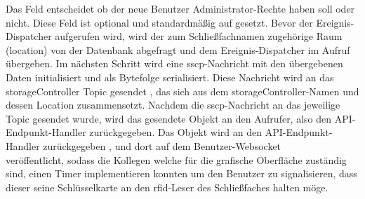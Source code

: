 Das Feld  entscheidet ob der neue Benutzer Administrator-Rechte haben soll oder nicht. Diese Feld ist optional und standardmäßig auf  gesetzt. Bevor der Ereignis-Dispatcher aufgerufen wird, wird der zum Schließfachnamen zugehörige Raum (location) von der Datenbank abgefragt und dem Ereignis-Dispatcher im Aufruf  übergeben. Im nächsten Schritt wird eine \acrshort{sscp}-Nachricht mit den übergebenen Daten initialisiert  und als Bytefolge  serialisiert. Diese Nachricht wird an das \gls{storageController} Topic gesendet , das sich aus dem \gls{storageController}-Namen und dessen Location  zusammensetzt. Nachdem die \acrshort{sscp}-Nachricht an das jeweilige Topic gesendet wurde, wird das gesendete Objekt an den Aufrufer, also den API-Endpunkt-Handler zurückgegeben. Das Objekt wird an den API-Endpunkt-Handler zurückgegeben , und dort auf dem Benutzer-Websocket\\  veröffentlicht, sodass die Kollegen welche für die grafische Oberfläche zuständig sind, einen Timer implementieren konnten um den Benutzer zu signalisieren, dass dieser seine Schlüsselkarte an den \acrshort{rfid}-Leser des Schließfaches halten möge.\bigskip

